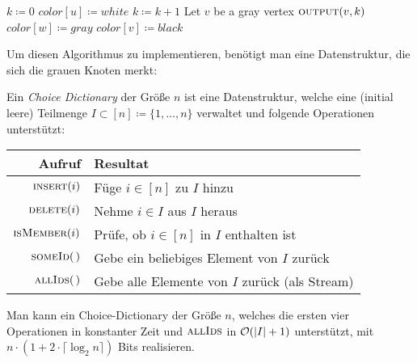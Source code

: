\documentclass{cheat-sheet}
\newcommand{\ceil}[1]{\lceil #1 \rceil} %
\renewcommand{\O}{\mathcal{O}} %
\begin{document}
\begin{alg} \mbox{}
  \begin{algorithmic}[1]
      \State $k \coloneqq 0$
        \State $color[u] \coloneqq white$ \EndFor
          \State \Continue
        \EndIf
        \State $k \coloneqq k + 1$
          \State Let $v$ be a gray vertex
          \State $\Call{output}{v, k}$
              \State $color[w] \coloneqq gray$
            \EndIf
            \State $color[v] \coloneqq black$
          \EndFor
        \EndWhile
      \EndFor
    \EndFunction
  \end{algorithmic}
\end{alg}

\begin{bem}
  Um diesen Algorithmus zu implementieren, benötigt man eine Datenstruktur, die sich die grauen Knoten merkt:
\end{bem}


\begin{defn}
  Ein \emph{Choice Dictionary} der Größe $n$ ist eine Datenstruktur, welche eine (initial leere) Teilmenge $I \subset [n] \coloneqq \{ 1, \ldots, n \}$ verwaltet und folgende Operationen unterstützt:
  
  \begin{tabular}{r l}
    Aufruf & Resultat \\[3pt] \hline
    $\Call{insert}{i}$ & Füge $i \in [n]$ zu $I$ hinzu \\
    $\Call{delete}{i}$ & Nehme $i \in I$ aus $I$ heraus \\
    $\Call{isMember}{i}$ & Prüfe, ob $i \in [n]$ in $I$ enthalten ist \\
    $\Call{someId}{\,}$ & Gebe ein beliebiges Element von $I$ zurück \\
    $\Call{allIds}{\,}$ & Gebe alle Elemente von $I$ zurück (als Stream)
  \end{tabular}
\end{defn}

\begin{lem}[CD\textsubscript{1}]
  Man kann ein Choice-Dictionary der Größe $n$, welches die ersten vier Operationen in konstanter Zeit und $\Call{allIds}{}$ in $\O(\abs{I} + 1)$ unterstützt, mit $n \cdot (1 + 2 \cdot \ceil{\log_2 n})$ Bits realisieren.
\end{lem}
\end{document}
